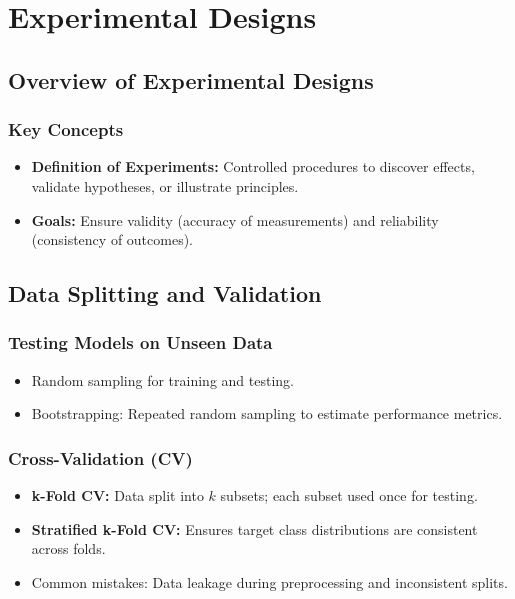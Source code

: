 \section{Experimental Designs}

\subsection{Overview of Experimental Designs}
\subsubsection{Key Concepts}
\begin{itemize}
    \item \textbf{Definition of Experiments:} Controlled procedures to discover effects, validate hypotheses, or illustrate principles.
    \item \textbf{Goals:} Ensure validity (accuracy of measurements) and reliability (consistency of outcomes).
\end{itemize}

\subsection{Data Splitting and Validation}
\subsubsection{Testing Models on Unseen Data}
\begin{itemize}
    \item Random sampling for training and testing.
    \item Bootstrapping: Repeated random sampling to estimate performance metrics.
\end{itemize}

\subsubsection{Cross-Validation (CV)}
\begin{itemize}
    \item \textbf{k-Fold CV:} Data split into \( k \) subsets; each subset used once for testing.
    \item \textbf{Stratified k-Fold CV:} Ensures target class distributions are consistent across folds.
    \item Common mistakes: Data leakage during preprocessing and inconsistent splits.
\end{itemize}

